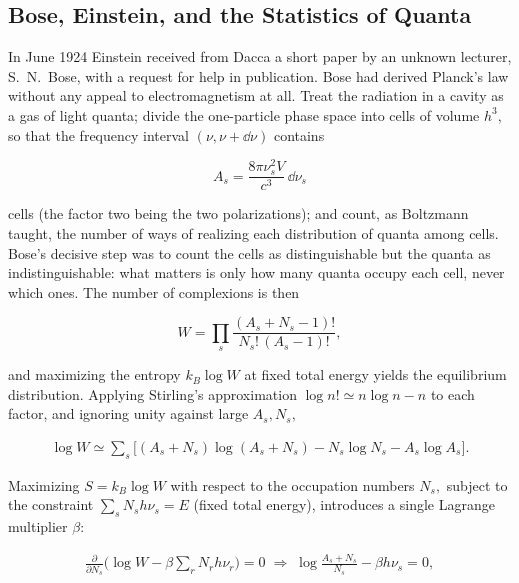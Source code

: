 \subsection{Bose, Einstein, and the Statistics of Quanta}
In June 1924 Einstein received from Dacca a short paper by an unknown lecturer, S.~N.~Bose, with a request for help in publication. Bose had derived Planck's law without any appeal to electromagnetism at all. Treat the radiation in a cavity as a gas of light quanta; divide the one-particle phase space into cells of volume $h^3,$ so that the frequency interval $(\nu,\nu+\dd\nu)$ contains
\begin{linenomath}
    \begin{equation}
        A_s=\frac{8\pi\nu_s^2V}{c^3}\,\dd\nu_s
    \end{equation}
\end{linenomath}
cells (the factor two being the two polarizations); and count, as Boltzmann taught, the number of ways of realizing each distribution of quanta among cells. Bose's decisive step was to count the cells as distinguishable but the quanta as indistinguishable: what matters is only how many quanta occupy each cell, never which ones. The number of complexions is then
\begin{linenomath}
    \begin{equation}
        W=\prod_s\frac{(A_s+N_s-1)!}{N_s!\,(A_s-1)!},
    \end{equation}
\end{linenomath}
and maximizing the entropy $k_B\log W$ at fixed total energy yields the equilibrium distribution. Applying Stirling's approximation $\log n!\simeq n\log n-n$ to each factor, and ignoring unity against large $A_s,N_s,$
\begin{linenomath}
    \begin{align}
        \log W\simeq\sum_{s}\bigl[(A_s+N_s)\log(A_s+N_s)-N_s\log N_s-A_s\log A_s\bigr].
    \end{align}
\end{linenomath}
Maximizing $S=k_B\log W$ with respect to the occupation numbers $N_s,$ subject to the constraint $\sum_s N_s h\nu_s=E$ (fixed total energy), introduces a single Lagrange multiplier $\beta$:
\begin{linenomath}
    \begin{align}
        \frac{\partial}{\partial N_s}\bigl(\log W-\beta\sum_{r}N_r h\nu_r\bigr)=0
        \;\Longrightarrow\;
        \log\frac{A_s+N_s}{N_s}-\beta h\nu_s=0,
    \end{align}
\end{linenomath}
